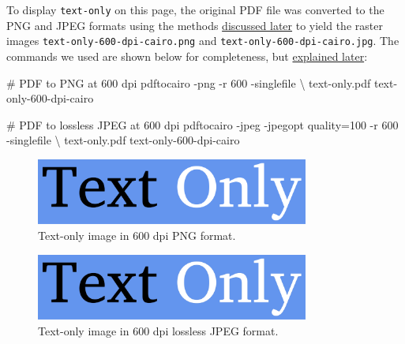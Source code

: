 \documentclass[
  a4paper,
]{article}
\newenvironment{Shaded}{\begin{snugshade}}{\end{snugshade}}
\newcommand{\AttributeTok}[1]{\textcolor[rgb]{0.80,0.80,0.80}{#1}}
\newcommand{\CommentTok}[1]{\textcolor[rgb]{0.50,0.62,0.50}{#1}}
\newcommand{\DataTypeTok}[1]{\textcolor[rgb]{0.87,0.87,0.75}{#1}}
\newcommand{\ExtensionTok}[1]{\textcolor[rgb]{0.80,0.80,0.80}{#1}}
\newcommand{\NormalTok}[1]{\textcolor[rgb]{0.80,0.80,0.80}{#1}}
\begin{document}
To display \texttt{text-only} on this page, the original PDF file was
converted to the PNG and JPEG formats using the methods
\protect\hyperlink{vector-to-raster}{discussed later} to yield the
raster images \texttt{text-only-600-dpi-cairo.png} and
\texttt{text-only-600-dpi-cairo.jpg}. The commands we used are shown
below for completeness, but
\protect\hyperlink{pdf-to-png-and-jpeg-poppler-and-cairo}{explained
later}:

\begin{Shaded}
\begin{Highlighting}[]
\CommentTok{\# PDF to PNG at 600 dpi}
\ExtensionTok{pdftocairo} \AttributeTok{{-}png} \AttributeTok{{-}r}\NormalTok{ 600 }\AttributeTok{{-}singlefile} \DataTypeTok{\textbackslash{}}
\NormalTok{text{-}only.pdf text{-}only{-}600{-}dpi{-}cairo}

\CommentTok{\# PDF to lossless JPEG at 600 dpi}
\ExtensionTok{pdftocairo} \AttributeTok{{-}jpeg} \AttributeTok{{-}jpegopt}\NormalTok{ quality=100 }\AttributeTok{{-}r}\NormalTok{ 600 }\AttributeTok{{-}singlefile} \DataTypeTok{\textbackslash{}}
\NormalTok{text{-}only.pdf text{-}only{-}600{-}dpi{-}cairo}
\end{Highlighting}
\end{Shaded}

\begin{figure}
\hypertarget{fig:text-only-png-cairo}{%
\centering
\includegraphics[width=0.8\textwidth,height=\textheight]{images/text-only-600-dpi-cairo.png}
\caption{Text-only image in 600 dpi PNG
format.}\label{fig:text-only-png-cairo}
}
\end{figure}

\begin{figure}
\hypertarget{fig:text-only-jpg-cairo}{%
\centering
\includegraphics[width=0.8\textwidth,height=\textheight]{images/text-only-600-dpi-cairo.jpg}
\caption{Text-only image in 600 dpi lossless JPEG
format.}\label{fig:text-only-jpg-cairo}
}
\end{figure}
\end{document}
